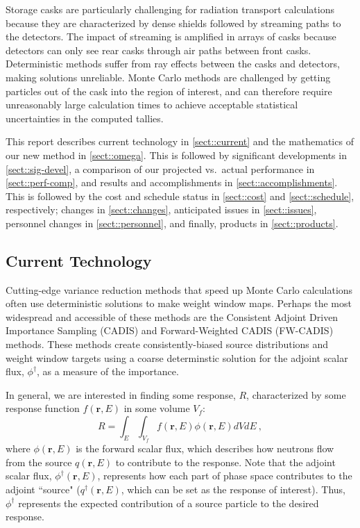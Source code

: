 \documentclass[12pt]{article}
\newcommand{\ve}[1]{\ensuremath{\mathbf{#1}}}
\begin{document}
Storage casks are particularly challenging for radiation transport calculations because they are characterized by dense shields followed by streaming paths to the detectors. 
The impact of streaming is amplified in arrays of casks because detectors can only see rear casks through air paths between front casks. 
Deterministic methods suffer from ray effects between the casks and detectors, making solutions unreliable. 
Monte Carlo methods are challenged by getting particles out of the cask into the region of interest, and can therefore require unreasonably large calculation times to achieve acceptable statistical uncertainties in the computed tallies.

This report describes current technology in \autoref{sect::current} and the mathematics of our new method in \autoref{sect::omega}. This is followed by significant developments in \autoref{sect::sig-devel}, a comparison of our projected vs.\ actual performance in \autoref{sect::perf-comp}, and results and accomplishments in \autoref{sect::accomplishments}. This is followed by the cost and schedule status in \autoref{sect::cost} and \autoref{sect::schedule}, respectively; changes in \autoref{sect::changes}, anticipated issues in \autoref{sect::issues}, personnel changes in \autoref{sect::personnel}, and finally, products in \autoref{sect::products}.  

\subsection{Current Technology}
\label{sect::current}
Cutting-edge variance reduction methods that speed up Monte Carlo calculations often use deterministic solutions to make weight window maps. 
Perhaps the most widespread and accessible of these methods are the Consistent Adjoint Driven Importance Sampling (CADIS) \cite{wagner_automatic_1997,wagner_automated_1998,haghighat_monte_2003} and Forward-Weighted CADIS (FW-CADIS) \cite{wagner_forward-weighted_2007,wagner_forward-weighted_2009,wagner_forward-weighted_2010} methods. 
These methods create consistently-biased source distributions and weight window targets using a coarse determinstic solution for the adjoint scalar flux, $\phi^{\dagger}$, as a measure of the importance. 

In general, we are interested in finding some response, $R$, characterized by some response function $f(\ve{r}, E)$ in some volume $V_f$:
%
\begin{equation}
 R = \int_E \int_{V_f} f(\ve{r}, E) \phi(\ve{r}, E) dV dE \:,
 \label{eq:Response}
\end{equation}
where $\phi(\ve{r}, E)$ is the forward scalar flux, which describes how neutrons flow from the source $q(\ve{r}, E)$ to contribute to the response. 
Note that the adjoint scalar flux, $\phi^{\dagger}(\ve{r}, E)$, represents how each part of phase space contributes to the adjoint ``source" ($q^{\dagger}(\ve{r}, E)$, which can be set as the response of interest). 
Thus, $\phi^{\dagger}$ represents the expected contribution of a source particle to the desired response.
 
\end{document}
